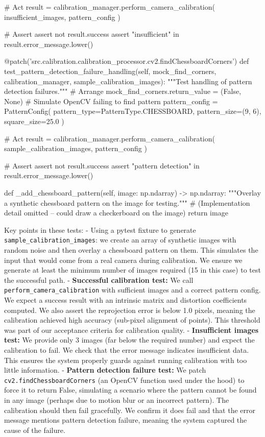             # Act
            result = calibration_manager.perform_camera_calibration(
                insufficient_images, 
                pattern_config
            )

            # Assert
            assert not result.success
            assert "insufficient" in result.error_message.lower()

        @patch('src.calibration.calibration_processor.cv2.findChessboardCorners')
        def test_pattern_detection_failure_handling(self, mock_find_corners, calibration_manager, sample_calibration_images):
            """Test handling of pattern detection failures."""
            # Arrange
            mock_find_corners.return_value = (False, None)  # Simulate OpenCV failing to find pattern
            pattern_config = PatternConfig(
                pattern_type=PatternType.CHESSBOARD,
                pattern_size=(9, 6),
                square_size=25.0
            )

            # Act
            result = calibration_manager.perform_camera_calibration(
                sample_calibration_images, 
                pattern_config
            )

            # Assert
            assert not result.success
            assert "pattern detection" in result.error_message.lower()

        def _add_chessboard_pattern(self, image: np.ndarray) -> np.ndarray:
            """Overlay a synthetic chessboard pattern on the image for testing."""
            # (Implementation detail omitted – could draw a checkerboard on the image)
            return image

Key points in these tests: - Using a pytest fixture to generate
\texttt{sample_calibration_images}: we create an array of synthetic images with
random noise and then overlay a chessboard pattern on them. This
simulates the input that would come from a real camera during
calibration. We ensure we generate at least the minimum number of images
required (15 in this case) to test the successful path. - \textbf{Successful
calibration test:} We call \texttt{perform_camera_calibration} with sufficient
images and a correct pattern config. We expect a success result with an
intrinsic matrix and distortion coefficients computed. We also assert
the reprojection error is below 1.0 pixels, meaning the calibration
achieved high accuracy (sub-pixel alignment of points). This threshold
was part of our acceptance criteria for calibration quality. -
\textbf{Insufficient images test:} We provide only 3 images (far below the
required number) and expect the calibration to fail. We check that the
error message indicates insufficient data. This ensures the system
properly guards against running calibration with too little
information. - \textbf{Pattern detection failure test:} We patch
\texttt{cv2.findChessboardCorners} (an OpenCV function used under the hood) to
force it to return False, simulating a scenario where the pattern cannot
be found in any image (perhaps due to motion blur or an incorrect
pattern). The calibration should then fail gracefully. We confirm it
does fail and that the error message mentions pattern detection failure,
meaning the system captured the cause of the failure.

